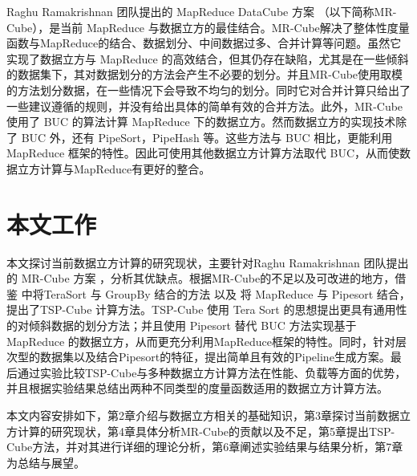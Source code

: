 Raghu Ramakrishnan 团队提出的 MapReduce DataCube 方案 \cite{nandi2012data} \cite{nandi2011distributed}（以下简称MR-Cube），是当前 MapReduce 与数据立方的最佳结合。MR-Cube解决了整体性度量函数与MapReduce的结合、数据划分、中间数据过多、合并计算等问题。虽然它实现了数据立方与 MapReduce 的高效结合，但其仍存在缺陷，尤其是在一些倾斜的数据集下，其对数据划分的方法会产生不必要的划分。并且MR-Cube使用取模的方法划分数据，在一些情况下会导致不均匀的划分。同时它对合并计算只给出了一些建议遵循的规则，并没有给出具体的简单有效的合并方法。此外，MR-Cube 使用了 BUC \cite{beyer1999bottom} 的算法计算 MapReduce 下的数据立方。然而数据立方的实现技术除了 BUC 外，还有 PipeSort，PipeHash \cite{agarwal1996computation} 等。这些方法与 BUC 相比，更能利用 MapReduce 框架的特性。因此可使用其他数据立方计算方法取代 BUC，从而使数据立方计算与MapReduce有更好的整合。










\section{本文工作}


本文探讨当前数据立方计算的研究现状，主要针对Raghu Ramakrishnan 团队提出的 MR-Cube 方案 \cite{nandi2012data} \cite{nandi2011distributed}，分析其优缺点。根据MR-Cube的不足以及可改进的地方，借鉴\cite{tao2013minimal} 中将TeraSort 与 GroupBy 结合的方法 以及 将 MapReduce 与 Pipesort 结合，提出了TSP-Cube 计算方法。TSP-Cube 使用 Tera Sort 的思想提出更具有通用性的对倾斜数据的划分方法；并且使用 Pipesort 替代 BUC 方法实现基于 MapReduce 的数据立方，从而更充分利用MapReduce框架的特性。同时，针对层次型的数据集以及结合Pipesort的特征，提出简单且有效的Pipeline生成方案。最后通过实验比较TSP-Cube与多种数据立方计算方法在性能、负载等方面的优势，并且根据实验结果总结出两种不同类型的度量函数适用的数据立方计算方法。



本文内容安排如下，第2章介绍与数据立方相关的基础知识，第3章探讨当前数据立方计算的研究现状，第4章具体分析MR-Cube的贡献以及不足，第5章提出TSP-Cube方法，并对其进行详细的理论分析，第6章阐述实验结果与结果分析，第7章为总结与展望。

